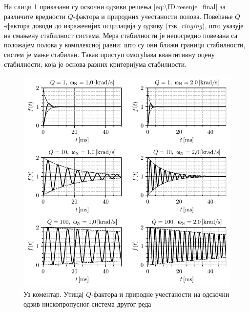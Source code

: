 На слици \ref{fig:\ID.comment} приказани су оскочни одзиви решења \eqref{eq:\ID.resenje_final} за различите 
вредности $Q$-фактора и природних учестаности полова. Повећање $Q$-фактора доводи до израженијих
осцилација у одзиву (тзв. \textit{ringing}), што указује на смањену стабилност система. Мера стабилности 
је непосредно повезана са положајем полова у комплексној равни: што су они ближи граници стабилности, систем је мање 
стабилан. Такав приступ омогућава квантитивну оцену стабилности, која је основа разних критеријума стабилности.
\begin{figure}[ht!]
    \centering
    \includegraphics[scale=1]{fig/Q_razliciti_odzivi.pdf}
    \caption{Уз коментар. Утицај $Q$-фактора и природне учестаности на одскочни одзив нископропусног система 
    другог реда}
    \label{fig:\ID.comment}
\end{figure}

